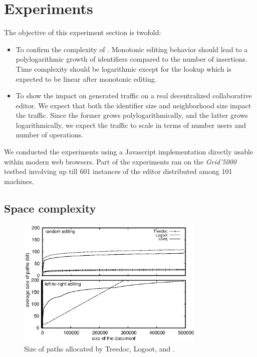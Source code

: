 \section{Experiments}
\label{sec:experiments}

The objective of this experiment section is twofold:
\begin{itemize}
\item To confirm the complexity of \LSEQ. Monotonic editing behavior should lead
  to a polylogarithmic growth of identifiers compared to the number of
  insertions. Time complexity should be logarithmic except for the lookup which
  is expected to be linear after monotonic editing.
\item To show the impact on generated traffic on a real decentralized
  collaborative editor. We expect that both the identifier size and neighborhood
  size impact the traffic. Since the former grows polylogarithmically, and the
  latter grows logarithmically, we expect the traffic to scale in terms of
  number users and number of operations.
\end{itemize}

We conducted the experiments using a Javascript implementation directly usable
within modern web browsers. Part of the experiments ran on the \emph{Grid'5000}
testbed involving up till 601 instances of the editor distributed among 101
machines.

\subsection{Space complexity}

\begin{figure}
  \centering
  \includegraphics[width=0.8\textwidth]{./img/space.eps}
  \caption{\label{fig:space}Size of paths allocated by Treedoc, Logoot, and
    \LSEQ.}
\end{figure}

